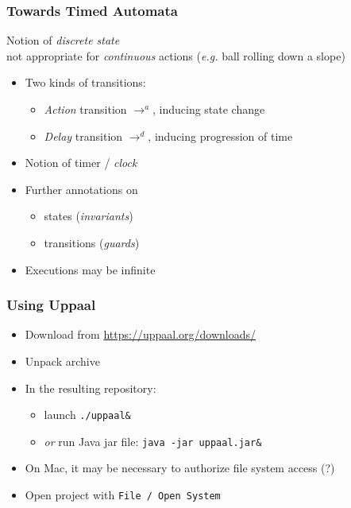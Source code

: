 \documentclass{beamer}
\begin{document}
\begin{frame}[fragile]\frametitle{Towards Timed Automata}

   Notion of \emph{discrete state}\\
    not appropriate for \emph{continuous} actions (\emph{e.g.} ball rolling down a slope)

\vspace{5mm}
\begin{itemize}
\item Two kinds of transitions:
  \begin{itemize}
  \item \emph{Action} transition $\to^a$, inducing state change
  \item \emph{Delay} transition  $\to^d$, inducing progression of time
  \end{itemize}
\item Notion of timer / \emph{clock}
\item Further annotations on
  \begin{itemize}
  \item states (\emph{invariants})
  \item transitions (\emph{guards})
  \end{itemize}
\item Executions may be infinite
\end{itemize}

\end{frame}

\begin{frame}[fragile]\frametitle{Using Uppaal}

  \begin{itemize}
  \item Download from \url{https://uppaal.org/downloads/}
  \item Unpack archive
  \item In the resulting repository:
    \begin{itemize}
    \item launch \texttt{./uppaal\&}
    \item \emph{or} run Java jar file: \texttt{java -jar uppaal.jar\&}
    \end{itemize}
  \item On Mac, it may be necessary to authorize file system access (?)
  \item Open project with \texttt{File / Open System}
  \end{itemize}

\end{frame}
\end{document}
